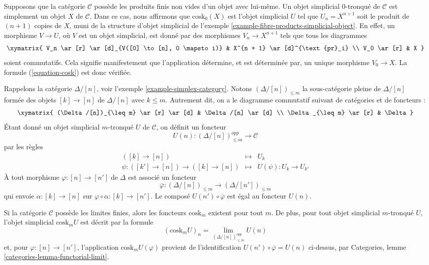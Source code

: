 \begin{example}
\label{example-cosk0}
Supposons que la catégorie $\mathcal{C}$ possède les produits finis non
vides d'un objet avec lui-même. Un objet simplicial $0$-tronqué de
$\mathcal{C}$ est simplement un objet $X$ de $\mathcal{C}$. Dans ce cas,
nous affirmons que $\text{cosk}_0(X)$ est l'objet simplicial $U$ tel que
$U_n = X^{n + 1}$ soit le produit de $(n + 1)$ copies de $X$, muni de la
structure d'objet simplicial de l'exemple
\ref{example-fibre-products-simplicial-object}. En effet, un morphisme
$V \to U$, où $V$ est un objet simplicial, est donné par des morphismes
$V_n \to X^{n + 1}$ tels que tous les diagrammes
$$
\xymatrix{
V_n \ar[r] \ar[d]_{V([0] \to [n], 0 \mapsto i)} &
X^{n + 1} \ar[d]^{\text{pr}_i} \\
V_0 \ar[r] &
X
}
$$
soient commutatifs. Cela signifie manifestement que l'application
détermine, et est déterminée par, un unique morphisme $V_0 \to X$.
La formule (\ref{equation-cosk}) est donc vérifiée.
\end{example}

\noindent
Rappelons la catégorie $\Delta/[n]$, voir l'exemple
\ref{example-simplex-category}. Notons $(\Delta/[n])_{\leq m}$ la
sous-catégorie pleine de $\Delta/[n]$ formée des objets
$[k] \to [n]$ de $\Delta/[n]$ avec $k \leq m$. Autrement dit, on a le diagramme
commutatif suivant de catégories et de foncteurs :
$$
\xymatrix{
(\Delta/[n])_{\leq m} \ar[r] \ar[d] &
\Delta/[n] \ar[d] \\
\Delta_{\leq m} \ar[r] &
\Delta
}
$$
Étant donné un objet simplicial $m$-tronqué $U$ de $\mathcal{C}$,
on définit un foncteur
$$
U(n) : (\Delta/[n])_{\leq m}^{opp} \longrightarrow \mathcal{C}
$$
par les règles
\begin{eqnarray*}
([k] \to [n]) & \longmapsto & U_k \\
\psi : ([k'] \to [n]) \to ([k] \to [n]) &
\longmapsto &
U(\psi) : U_k \to U_{k'}
\end{eqnarray*}
À tout morphisme $\varphi : [n] \to [n']$ de $\Delta$ est associé un foncteur
$$
\overline{\varphi} :
(\Delta/[n])_{\leq m}
\longrightarrow
(\Delta/[n'])_{\leq m}
$$
qui envoie $\alpha : [k] \to [n]$ sur
$\varphi \circ \alpha : [k] \to [n']$. Le composé
$U(n') \circ \overline{\varphi}$ est égal au foncteur $U(n)$.

\begin{lemma}
\label{lemma-existence-cosk}
Si la catégorie $\mathcal{C}$ possède les limites finies, alors les
foncteurs $\text{cosk}_m$ existent pour tout $m$. De plus, pour tout
objet simplicial $m$-tronqué $U$, l'objet simplicial
$\text{cosk}_mU$ est décrit par la formule
$$
(\text{cosk}_mU)_n = \lim_{(\Delta/[n])_{\leq m}^{opp}} U(n)
$$
et, pour $\varphi : [n] \to [n']$, l'application
$\text{cosk}_mU(\varphi)$ provient de l'identification
$U(n') \circ \overline{\varphi} = U(n)$ ci-dessus, par Categories,
lemme \ref{categories-lemma-functorial-limit}.
\end{lemma}

